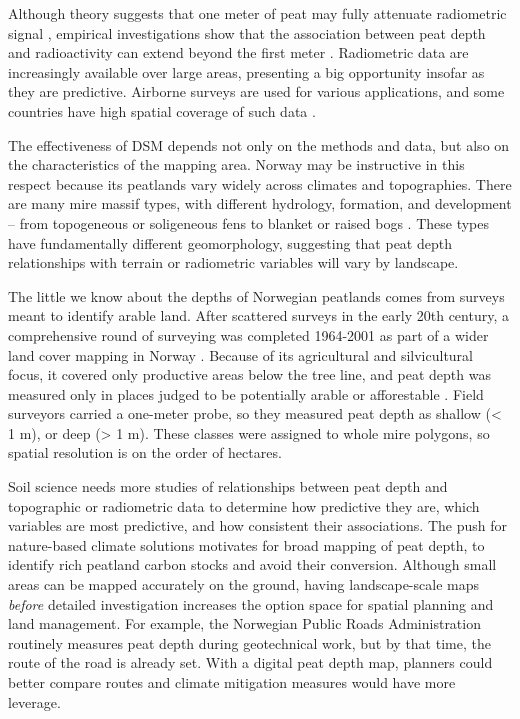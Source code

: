 \documentclass[soil, manuscript]{copernicus}
\begin{document}
Although theory suggests that one meter of peat may fully attenuate radiometric signal \citep{beamishGammaRayAttenuation2013, reinhardtGammaraySpectrometryVersatile2019}, empirical investigations show that the association between peat depth and radioactivity can extend beyond the first meter \citep{gatisMappingUplandPeat2019, kogantiMappingPeatDepth2023}.
Radiometric data are increasingly available over large areas, presenting a big opportunity insofar as they are predictive.
Airborne surveys are used for various applications, and some countries have high spatial coverage of such data \citep{minasnyDigitalMappingPeatlands2019, baranwalAirborneGeophysicalSurveys2020}.

The effectiveness of DSM depends not only on the methods and data, but also on the characteristics of the mapping area.
Norway may be instructive in this respect because its peatlands vary widely across climates and topographies. There are many mire massif types, with different hydrology, formation, and development -- from topogeneous or soligeneous fens to blanket or raised bogs \citep{lyngstadBeskrivelserAvTorvmassivenheter2023}.
These types have fundamentally different geomorphology, suggesting that peat depth relationships with terrain or radiometric variables will vary by landscape.

The little we know about the depths of Norwegian peatlands comes from surveys meant to identify arable land.
After scattered surveys in the early 20th century, a comprehensive round of surveying was completed 1964-2001 as part of a wider land cover mapping in Norway \citep{bjordalMarkslagsklassifikasjonOkonomiskKartverk2007}.
Because of its agricultural and silvicultural focus, it covered only productive areas below the tree line, and peat depth was measured only in places judged to be potentially arable or afforestable \citep{ahlstromAR5Klassifikasjonssystem2019}.
Field surveyors carried a one-meter probe, so they measured peat depth as shallow (\textless{} 1 m), or deep (\textgreater{} 1 m).
These classes were assigned to whole mire polygons, so spatial resolution is on the order of hectares.

Soil science needs more studies of relationships between peat depth and topographic or radiometric data to determine how predictive they are, which variables are most predictive, and how consistent their associations.
The push for nature-based climate solutions motivates for broad mapping of peat depth, to identify rich peatland carbon stocks and avoid their conversion.
Although small areas can be mapped accurately on the ground, having landscape-scale maps \emph{before} detailed investigation increases the option space for spatial planning and land management.
For example, the Norwegian Public Roads Administration routinely measures peat depth during geotechnical work, but by that time, the route of the road is already set.
With a digital peat depth map, planners could better compare routes and climate mitigation measures would have more leverage.
\end{document}
